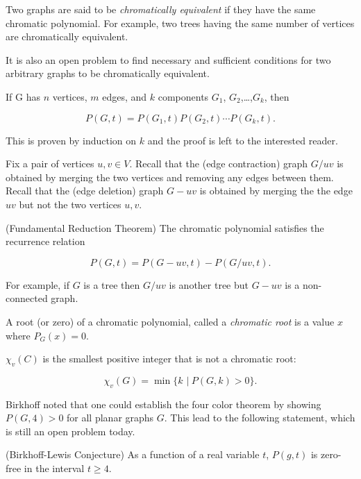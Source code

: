 Two graphs are said to be {\it chromatically equivalent} if they have the
same chromatic polynomial. For example, two trees having the same
number of vertices are chromatically equivalent.

It is also an open problem to find necessary and sufficient conditions
for two arbitrary graphs to be chromatically equivalent.

\begin{theorem}
If G has $n$ vertices, $m$ edges, and $k$ components $G_1$,
$G_2$,\dots ,$G_k$, then

\[
P(G, t) = P(G_1, t)P(G_2,t) \cdots P(G_k,t).
\]
\end{theorem}

This is proven by induction on $k$ and the proof is left to the 
interested reader.

Fix a pair of vertices $u, v\in V$.
Recall that the (edge contraction) 
graph $G/uv$ is obtained by merging the two vertices and removing 
any edges between them. Recall that the (edge deletion)
graph $G-uv$ is obtained by merging the the edge $uv$ but not the
two vertices $u,v$.

\begin{theorem}
(Fundamental Reduction Theorem)
The chromatic polynomial satisfies the recurrence relation

\[
    P(G,t) = P(G-uv, t) - P(G/uv,t) .
\]
\end{theorem}

For example, if $G$ is a tree then $ G/uv$ is another tree
but $ G-uv$ is a non-connected graph.

A root (or zero) of a chromatic polynomial, called a {\it chromatic root}
is a value $x$ where $P_G(x)=0$. 

\begin{theorem}  
$\chi_v(C)$ is the smallest positive integer that is not a chromatic root:

\[
    \chi_v (G)=\min\{ k\,\ |\ P(G,k) > 0 \}. 
\]
\end{theorem}

Birkhoff noted that one could establish the four color theorem by
showing $P(G,4)>0$ for all planar graphs $G$. This lead to the
following statement, which is still an open problem today.

\begin{conjecture}
(Birkhoff-Lewis Conjecture) 
As a function of a real variable $t$, $P(g,t)$ is zero-free in the
interval $t\geq 4$.
\end{conjecture}


